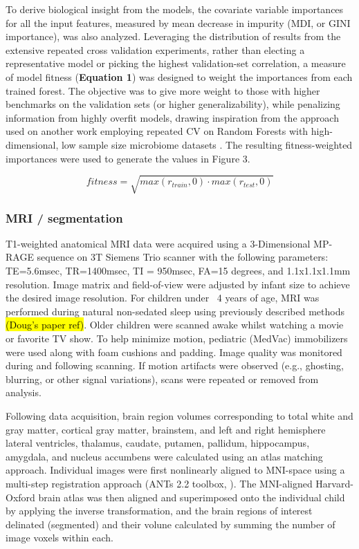\documentclass{article}
\begin{document}
To derive biological insight from the models, the covariate variable
importances for all the input features, measured by mean decrease in
impurity (MDI, or GINI importance), was also analyzed. Leveraging the
distribution of results from the extensive repeated cross validation
experiments, rather than electing a representative model or picking the
highest validation-set correlation, a measure of model fitness
(\textbf{Equation 1}) was designed to weight the importances from each
trained forest. The objective was to give more weight to those with
higher benchmarks on the validation sets (or higher generalizability),
while penalizing information from highly overfit models, drawing
inspiration from the approach used on another work employing repeated CV
on Random Forests with high-dimensional, low sample size microbiome
datasets \cite{woodruffInflammationAutoreactivityDefine2022}.
The resulting fitness-weighted importances were used
to generate the values in Figure 3.

\begin{equation}
    fitness = \sqrt{max(r_{train}, 0) \cdot max(r_{test}, 0)}
\end{equation}


\subsubsection*{MRI / segmentation}

T1-weighted anatomical MRI data were acquired using a 3-Dimensional MP-RAGE sequence
on 3T Siemens Trio scanner with the following parameters:
TE=5.6msec, TR=1400msec, TI = 950msec, FA=15 degrees, and 1.1x1.1x1.1mm resolution.
Image matrix and field-of-view were adjusted by infant size to achieve the desired image resolution.
For children under ~4 years of age, MRI was performed during natural non-sedated sleep using previously described methods \hl{(Doug's paper ref)}.
Older children were scanned awake whilst watching a movie or favorite TV show.
To help minimize motion, pediatric (MedVac) immobilizers were used along with foam cushions and padding.
Image quality was monitored during and following scanning.
If motion artifacts were observed (e.g., ghosting, blurring, or other signal variations), scans were repeated or removed from analysis.

Following data acquisition, brain region volumes corresponding to total white and gray matter,
cortical gray matter, brainstem, and left and right hemisphere lateral ventricles,
thalamus, caudate, putamen, pallidum, hippocampus, amygdala,
and nucleus accumbens were calculated using an atlas matching approach\cite{bruchhageLongitudinalBrainCognitive}.
Individual images were first nonlinearly aligned to MNI-space using
a multi-step registration approach (ANTs 2.2 toolbox, \cite{avantsInsightToolKitImage2014}).
The MNI-aligned Harvard-Oxford brain atlas was then aligned and superimposed onto the individual child
by applying the inverse transformation, and the brain regions of interest delinated (segmented)
and their volune calculated by summing the number of image voxels within each\cite{jenkinsonFSL2012}.
\end{document}

